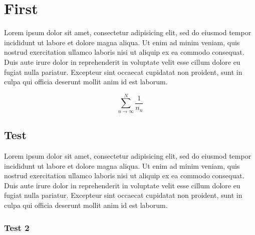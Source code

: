 \documentclass[a4paper]{article}
\title{\mytitle}
\author{
{\myauthor} \\
\textit{\small \myaffiliation} \\
\small{\texttt{\href{\myemail}{\myemail}}}
}
\date{\today} %
\begin{document}
\maketitle
\begin{abstract}
Lorem ipsum dolor sit amet, consectetur adipisicing elit, sed do eiusmod tempor incididunt ut labore
et dolore magna aliqua. Ut enimad minim veniam, quis nostrud exercitation ullamco laboris
nisi ut aliquip ex ea commodo consequat. Duis aute irure dolor in reprehenderit in voluptate velit
esse cillum dolore eu fugiat nulla pariatur. Excepteur sint occaecat cupidatat non proident, sunt
in culpa qui ocia deserunt mollit anim id est laborum.
\end{abstract}



\section{First}
Lorem ipsum dolor sit amet, consectetur adipisicing elit, sed do eiusmod
tempor incididunt ut labore et dolore magna aliqua. Ut enim ad minim veniam,
quis nostrud exercitation ullamco laboris nisi ut aliquip ex ea commodo
consequat. Duis aute irure dolor in reprehenderit in voluptate velit esse
cillum dolore eu fugiat nulla pariatur. Excepteur sint occaecat cupidatat non
proident, sunt in culpa qui officia deserunt mollit anim id est laborum.
 \begin{theorem}
 \end{theorem}
\[
	\sum_{n \rightarrow \infty}^N \frac{1}{n_n}
\]

\subsection{Test} %
\label{sub:test}
Lorem ipsum dolor sit amet, consectetur adipisicing elit, sed do eiusmod
tempor incididunt ut labore et dolore magna aliqua. Ut enim ad minim veniam,
quis nostrud exercitation ullamco laboris nisi ut aliquip ex ea commodo
consequat. Duis aute irure dolor in reprehenderit in voluptate velit esse
cillum dolore eu fugiat nulla pariatur. Excepteur sint occaecat cupidatat non
proident, sunt in culpa qui officia deserunt mollit anim id est laborum.
 \begin{definition}
 \end{definition}
\subsubsection{Test 2} %
\label{ssub:test_2}
\end{document}
